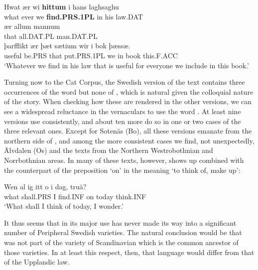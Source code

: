 
\ea\label{}
\gll Hwat  ær  wi  \textbf{hittum} i  hans  laghsaghu\\
what  ever  we  \textbf{find.PRS.1PL} in  his  law.DAT\\
\gll ær  allum  mannum\\
that  all.DAT.PL  man.DAT.PL\\
\gll þarfflikt  ær  þæt  sætium  wir  i  bok  þæssæ.\\
useful  be.PRS  that  put.PRS.1PL  we  in  book  this.F.ACC\\
\glt ‘Whatever we find in his law that is useful for everyone we include in this book.’
\z

Turning now to the Cat Corpus, the Swedish version of the text contains three occurrences of the word  but none of , which is natural given the colloquial nature of the story. When checking how these are rendered in the other versions, we can see a widespread reluctance in the vernaculars to use the word . At least nine versions use  consistently, and about ten more do so in one or two cases of the three relevant ones. Except for Sotenäs (Bo), all these versions emanate from the northern side of , and among the more consistent cases we find, not unexpectedly, Älvdalen (Os) and the texts from the Northern Westrobothnian and Norrbothnian areas. In many of these texts, however,  shows up combined with the counterpart of the preposition  ‘on’ in the meaning ‘to think of, make up’:


\ea\label{}
\gll Wen  al  ig  itt  o  i dag,  truä?\\
what  shall.PRS  I  find.INF  on  today  think.INF\\
\glt ‘What shall I think of today, I wonder.’
\z

It thus seems that  in its major use has never made its way into a significant number of Peripheral Swedish varieties. The natural conclusion would be that  was not part of the variety of Scandinavian which is the common ancestor of those varieties. In at least this respect, then, that language would differ from that of the Upplandic law. 

